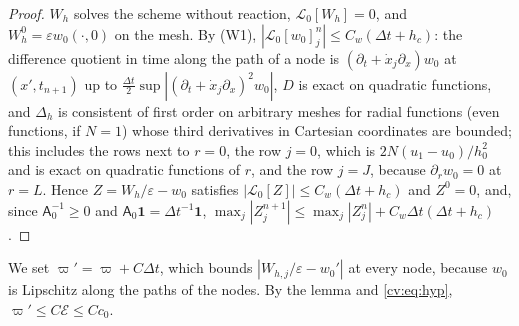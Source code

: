\documentclass[11pt]{amsart}
\theoremstyle{definition}
\theoremstyle{remark}
\newcommand{\ve}{\varepsilon}
\newcommand{\Lop}{\mathcal{L}}
\begin{document}
\begin{proof}
$W_h$ solves the scheme without reaction, $\Lop_0[W_h]=0$, and $W_h^0=\ve w_0(\cdot,0)$ on
the mesh. By (W1), $|\Lop_0[w_0]^n_j|\le C_w(\Delta t+h_c)$: the difference quotient in time along
the path of a node is $(\partial_t+\dot x_j\partial_x)w_0$ at $(x',t_{n+1})$ up to
$\frac{\Delta t}2\sup|(\partial_t+\dot x_j\partial_x)^2w_0|$, $D$ is exact on quadratic functions, and $\Delta_h$ is
consistent of first order on arbitrary meshes for radial functions (even functions, if
$N=1$) whose third derivatives in Cartesian coordinates are bounded; this includes the
rows next to $r=0$, the row $j=0$, which is $2N(u_1-u_0)/h_0^2$ and is exact on quadratic
functions of $r$, and the row $j=J$, because $\partial_rw_0=0$ at $r=L$. Hence $Z=W_h/\ve-w_0$
satisfies $|\Lop_0[Z]|\le C_w(\Delta t+h_c)$ and $Z^0=0$, and, since $\mathsf A_0^{-1}\ge0$ and
$\mathsf A_0\mathbf 1=\Delta t^{-1}\mathbf 1$,
$\max_j|Z^{n+1}_j|\le\max_j|Z^n_j|+C_w\Delta t(\Delta t+h_c)$.
\end{proof}

We set $\varpi'=\varpi+C\Delta t$, which bounds $|W_{h,j}/\ve-w_0'|$ at every node, because $w_0$ is
Lipschitz along the paths of the nodes. By the lemma and \eqref{cv:eq:hyp},
$\varpi'\le C\mathcal E\le Cc_0$.
\end{document}
